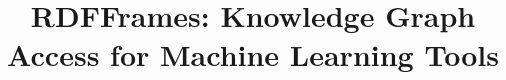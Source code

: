 \documentclass[sigconf]{acmart}
\newcommand{\rdfframes}{RDFFrames\xspace}
\def\qc{\superscript{$\bigstar$}}
\def\cse{\superscript{$\blacklozenge$}}
\def\bspc{\superscript{$\blacktriangle$}}
\def\tub{\superscript{$\blacktriangledown$}}
\begin{document}
\title{\rdfframes: Knowledge Graph Access for Machine Learning Tools}



%
\end{document}

